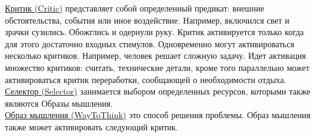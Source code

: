\underline{Критик (Critic)} представляет собой определенный предикат: внешние обстоятельства, события или иное воздействие. Например, включился свет и зрачки сузились. Обожглись и одернули руку. Критик активируется только когда для этого достаточно входных стимулов. Одновременно могут активироваться несколько критиков. Например, человек решает сложную задачу. Идет активация множество критиков: считать, технические детали, кроме того параллельно может активироваться критик переработки, сообщающей о необходимости отдыха.\\
\underline{Селектор (Selector)} занимается выбором определенных ресурсов, которыми также являются Образы мышления. \\
\underline{Образ мышления (WayToThink)} это способ решения проблемы. Образ мышления также может активировать следующий критик. \\

